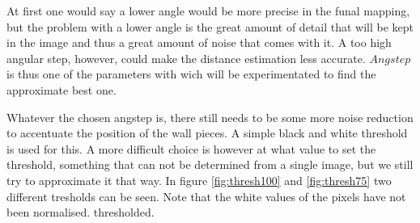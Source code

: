 \documentclass[a4paper, 20pt]{article}
\begin{document}
\begin{figure}[!ht]
\centering
\begin{floatrow}
  
\end{floatrow}
\end{figure}

At first one would say a lower angle would be more precise in the funal mapping, 
but the problem with a lower angle is the great amount of detail that will be
kept in the image and thus a
great amount of noise that comes with it. A too high angular step, however,
could make the distance estimation less accurate.
$Angstep$ is thus one of the parameters with
wich will be experimentated to find the approximate best one.

Whatever the chosen angstep is, there still needs to be some more noise
reduction to accentuate the position of the wall pieces. A simple black and
white threshold is used for this. A more difficult choice is however at what
value to set the threshold, something that can not be determined from a single
image, but we still try to approximate it that way. In figure \ref{fig:thresh100} and
\ref{fig:thresh75} two different tresholds can be seen. Note that the white
values  of the pixels have not been normalised.
thresholded.
\end{document}
